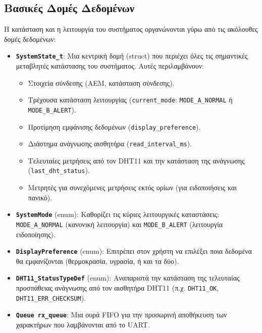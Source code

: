 \documentclass{article}
\begin{document}
\subsection{Βασικές Δομές Δεδομένων}
Η κατάσταση και η λειτουργία του συστήματος οργανώνονται γύρω από τις ακόλουθες δομές δεδομένων:
\begin{itemize}
    \item \textbf{\texttt{SystemState\_t}}: Μια κεντρική δομή (struct) που περιέχει όλες τις σημαντικές μεταβλητές κατάστασης του συστήματος. Αυτές περιλαμβάνουν:
    \begin{itemize}
        \item Στοιχεία σύνδεσης (ΑΕΜ, κατάσταση σύνδεσης).
        \item Τρέχουσα κατάσταση λειτουργίας (\texttt{current\_mode}: \texttt{MODE\_A\_NORMAL} ή \texttt{MODE\_B\_ALERT}).
        \item Προτίμηση εμφάνισης δεδομένων (\texttt{display\_preference}).
        \item Διάστημα ανάγνωσης αισθητήρα (\texttt{read\_interval\_ms}).
        \item Τελευταίες μετρήσεις από τον DHT11 και την κατάσταση της ανάγνωσης (\texttt{last\_dht\_status}).
        \item Μετρητές για συνεχόμενες μετρήσεις εκτός ορίων (για ειδοποιήσεις και πανικό).
    \end{itemize}
    \item \textbf{\texttt{SystemMode}} (enum): Καθορίζει τις κύριες λειτουργικές καταστάσεις: \texttt{MODE\_A\_NORMAL} (κανονική λειτουργία) και \texttt{MODE\_B\_ALERT} (λειτουργία ειδοποίησης).
    \item \textbf{\texttt{DisplayPreference}} (enum): Επιτρέπει στον χρήστη να επιλέξει ποια δεδομένα θα εμφανίζονται (θερμοκρασία, υγρασία, ή και τα δύο).
    \item \textbf{\texttt{DHT11\_StatusTypeDef}} (enum): Αναπαριστά την κατάσταση της τελευταίας προσπάθειας ανάγνωσης από τον αισθητήρα DHT11 (π.χ. \texttt{DHT11\_OK}, \texttt{DHT11\_ERR\_CHECKSUM}).
    \item \textbf{\texttt{Queue rx\_queue}}: Μια ουρά FIFO για την προσωρινή αποθήκευση των χαρακτήρων που λαμβάνονται από το UART.
\end{itemize}
\end{document}
